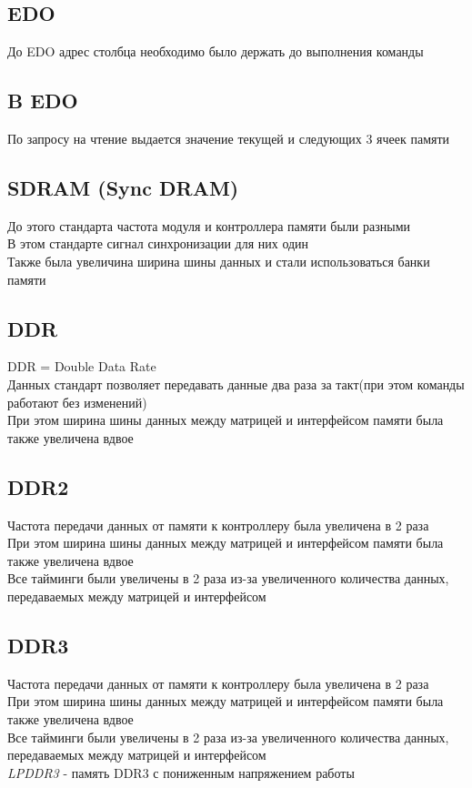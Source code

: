 \documentclass[12pt]{article}
\begin{document}
\subsection{EDO}
До EDO адрес столбца необходимо было держать до выполнения команды
\subsection{B EDO}
По запросу на чтение выдается значение текущей и следующих 3 ячеек памяти
\subsection{SDRAM (Sync DRAM)}
До этого стандарта частота модуля и контроллера памяти были разными\\
В этом стандарте сигнал синхронизации для них один\\
Также была увеличина ширина шины данных и стали использоваться банки памяти
\subsection{DDR}
DDR = Double Data Rate\\
Данных стандарт позволяет передавать данные два раза за такт(при этом команды работают без изменений)\\
При этом ширина шины данных между матрицей и интерфейсом памяти была также увеличена вдвое
\subsection{DDR2}
Частота передачи данных от памяти к контроллеру была увеличена в 2 раза\\
При этом ширина шины данных между матрицей и интерфейсом памяти была также увеличена вдвое\\
Все тайминги были увеличены в 2 раза из-за увеличенного количества данных, передаваемых между матрицей и интерфейсом
\subsection{DDR3}
Частота передачи данных от памяти к контроллеру была увеличена в 2 раза\\
При этом ширина шины данных между матрицей и интерфейсом памяти была также увеличена вдвое\\
Все тайминги были увеличены в 2 раза из-за увеличенного количества данных, передаваемых между матрицей и интерфейсом\\
\textit{LPDDR3} - память DDR3 с пониженным напряжением работы
\end{document}
